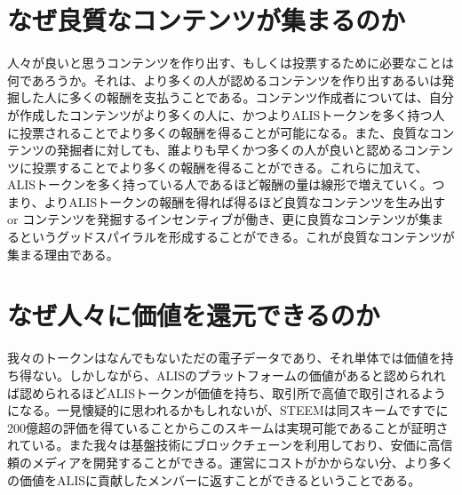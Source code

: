 \documentclass{jsarticle}
\begin{document}
\section{なぜ良質なコンテンツが集まるのか}
人々が良いと思うコンテンツを作り出す、もしくは投票するために必要なことは何であろうか。それは、より多くの人が認めるコンテンツを作り出すあるいは発掘した人に多くの報酬を支払うことである。コンテンツ作成者については、自分が作成したコンテンツがより多くの人に、かつよりALISトークンを多く持つ人に投票されることでより多くの報酬を得ることが可能になる。また、良質なコンテンツの発掘者に対しても、誰よりも早くかつ多くの人が良いと認めるコンテンツに投票することでより多くの報酬を得ることができる。これらに加えて、ALISトークンを多く持っている人であるほど報酬の量は線形で増えていく。つまり、よりALISトークンの報酬を得れば得るほど良質なコンテンツを生み出す or コンテンツを発掘するインセンティブが働き、更に良質なコンテンツが集まるというグッドスパイラルを形成することができる。これが良質なコンテンツが集まる理由である。
\section{なぜ人々に価値を還元できるのか}
我々のトークンはなんでもないただの電子データであり、それ単体では価値を持ち得ない。しかしながら、ALISのプラットフォームの価値があると認められれば認められるほどALISトークンが価値を持ち、取引所で高値で取引されるようになる。一見懐疑的に思われるかもしれないが、STEEMは同スキームですでに200億超の評価を得ていることからこのスキームは実現可能であることが証明されている。また我々は基盤技術にブロックチェーンを利用しており、安価に高信頼のメディアを開発することができる。運営にコストがかからない分、より多くの価値をALISに貢献したメンバーに返すことができるということである。
\end{document}
